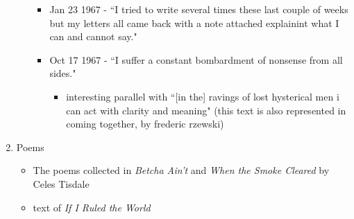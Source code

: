 \documentclass[14pt, letterpaper]{report}
\begin{document}
\begin{enumerate}
\begin{itemize}
\begin{itemize}
					\item   Jan 23 1967 - ``I tried to write several times these last couple of weeks 
						but my letters all came back with a note attached explainint what I can and 
						cannot say."\autocite[101]{soledad-brother}

					\item   Oct 17 1967 - ``I suffer a constant bombardment of nonsense from all 
						sides."\autocite[139]{soledad-brother}
						\begin{itemize}
							\item interesting parallel with ``[in the] ravings of lost hysterical
							men i can act with clarity and meaning"\autocite[110]{letters-from-attica}
							(this text is also represented in coming together, by frederic rzewski)\autocite{coming-together}
						\end{itemize} 

				\end{itemize}
		
		\end{itemize}			

		\item   Poems
			\begin{itemize}
				
				\item The poems collected in \textit{Betcha Ain't} and \textit{When the Smoke Cleared} by Celes Tisdale
				

				\item text of \textit{If I Ruled the World}				
		
			\end{itemize}

%				
%


\end{enumerate}
\end{document}
